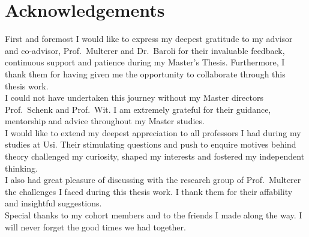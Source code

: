 \chapter*{Acknowledgements}
\thispagestyle{empty}

First and foremost I would like to express my deepest gratitude to my advisor and co-advisor, Prof.\ Multerer and Dr.\ Baroli for their invaluable feedback, continuous support and patience during my Master's Thesis. Furthermore, I thank them for having given me the opportunity to collaborate through this thesis work.
\\
I could not have undertaken this journey without my Master directors Prof.\ Schenk and Prof.\ Wit. I am extremely grateful for their guidance, mentorship and advice throughout my Master studies.
\\
I would like to extend my deepest appreciation to all professors I had during my studies at Usi. Their stimulating questions and push to enquire motives behind theory challenged my curiosity, shaped my interests and fostered my independent thinking.
\\
I also had great pleasure of discussing with the research group of Prof.\ Multerer the challenges I faced during this thesis work. I thank them for their affability  and insightful suggestions.
\\
Special thanks to my cohort members and to the friends I made along the way. I will never forget the good times we had together.
\clearpage